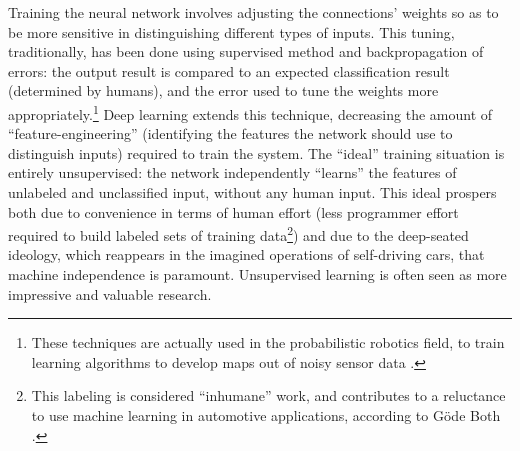 
Training the
neural network involves adjusting the connections' weights so as to
be more sensitive in distinguishing different types of
inputs. This tuning,
traditionally, has been done using supervised method and
backpropagation of errors: the output result is compared to an
expected classification result (determined by humans), and the error used to tune the weights
more appropriately.\footnote{These techniques are actually used in the
probabilistic robotics field, to train learning algorithms to develop
maps out of noisy sensor data \cite[p. 284-297]{thrunProb}.} Deep
learning extends this technique, decreasing 
the amount of ``feature-engineering'' (identifying the
features the network should use to distinguish inputs) required to
train the system. The ``ideal'' training situation is entirely
unsupervised: the network independently ``learns'' the features of
unlabeled and unclassified input, without any human input. This ideal
prospers both due to convenience in terms of human effort (less
programmer effort required to build labeled sets of training
data\footnote{This labeling is considered ``inhumane'' work, and contributes to
a reluctance to use machine learning in automotive applications,
according to G\"{o}de Both \cite{bothpt2}.}) and
due to the deep-seated ideology, which reappears in the imagined
operations of self-driving cars, that machine independence is
paramount. Unsupervised learning is often seen as more impressive and
valuable research.




